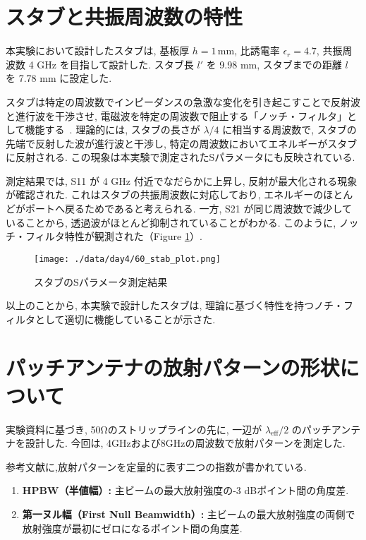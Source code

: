 \documentclass[a4paper, twocolumn]{article} %
\begin{document}
\section{スタブと共振周波数の特性}

本実験において設計したスタブは, 基板厚 \( h = 1 \, \text{mm} \), 比誘電率 \( \epsilon_r = 4.7 \), 共振周波数 4 GHz を目指して設計した. スタブ長 \( l' \) を 9.98 mm, スタブまでの距離 \( l \) を 7.78 mm に設定した.


スタブは特定の周波数でインピーダンスの急激な変化を引き起こすことで反射波と進行波を干渉させ, 電磁波を特定の周波数で阻止する「ノッチ・フィルタ」として機能する~\cite{cqpub}.
 理論的には, スタブの長さが \(\lambda / 4\) に相当する周波数で, スタブの先端で反射した波が進行波と干渉し, 特定の周波数においてエネルギーがスタブに反射される. この現象は本実験で測定されたSパラメータにも反映されている.

測定結果では, S11 が 4 GHz 付近でなだらかに上昇し, 反射が最大化される現象が確認された. これはスタブの共振周波数に対応しており, エネルギーのほとんどがポートへ戻るためであると考えられる. 一方, S21 が同じ周波数で減少していることから, 透過波がほとんど抑制されていることがわかる. このように, ノッチ・フィルタ特性が観測された（Figure \ref{fig:stab_plot}）.

\begin{figure}[H]
    \centering
    \texttt{[image: ./data/day4/60\_stab\_plot.png]}
    \caption{スタブのSパラメータ測定結果}
    \label{fig:stab_plot}
\end{figure}


以上のことから, 本実験で設計したスタブは, 理論に基づく特性を持つノチ・フィルタとして適切に機能していることが示さた.



\section{パッチアンテナの放射パターンの形状について}
実験資料に基づき, 50Ωのストリップラインの先に, 一辺が \(\lambda_{\text{eff}}/2\) のパッチアンテナを設計した. 今回は, 4GHzおよび8GHzの周波数で放射パターンを測定した.

参考文献\cite{highfreq-tutorial}に,放射パターンを定量的に表す二つの指数が書かれている.
\begin{enumerate}
  \item \textbf{HPBW（半値幅）:} 主ビームの最大放射強度の-3 dBポイント間の角度差.
  \item \textbf{第一ヌル幅（First Null Beamwidth）:} 主ビームの最大放射強度の両側で放射強度が最初にゼロになるポイント間の角度差.
\end{enumerate}
\end{document}

